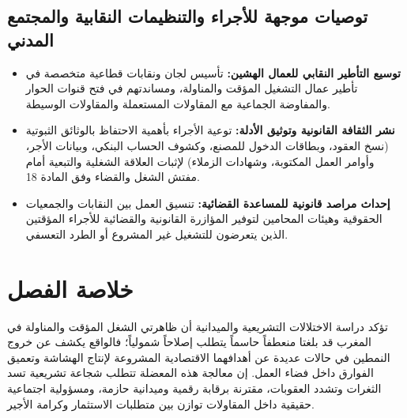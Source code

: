 \subsection{توصيات موجهة للأجراء والتنظيمات النقابية والمجتمع المدني}
\begin{itemize}[leftmargin=*, itemsep=6pt]
    \item \textbf{توسيع التأطير النقابي للعمال الهشين:} تأسيس لجان ونقابات قطاعية متخصصة في تأطير عمال التشغيل المؤقت والمناولة، ومساندتهم في فتح قنوات الحوار والمفاوضة الجماعية مع المقاولات المستعملة والمقاولات الوسيطة.
    \item \textbf{نشر الثقافة القانونية وتوثيق الأدلة:} توعية الأجراء بأهمية الاحتفاظ بالوثائق الثبوتية (نسخ العقود، وبطاقات الدخول للمصنع، وكشوف الحساب البنكي، وبيانات الأجر، وأوامر العمل المكتوبة، وشهادات الزملاء) لإثبات العلاقة الشغلية والتبعية أمام مفتش الشغل والقضاء وفق المادة \textenglish{18}.
    \item \textbf{إحداث مراصد قانونية للمساعدة القضائية:} تنسيق العمل بين النقابات والجمعيات الحقوقية وهيئات المحامين لتوفير المؤازرة القانونية والقضائية للأجراء المؤقتين الذين يتعرضون للتشغيل غير المشروع أو الطرد التعسفي.
\end{itemize}

\section*{خلاصة الفصل}

تؤكد دراسة الاختلالات التشريعية والميدانية أن ظاهرتي الشغل المؤقت والمناولة في المغرب قد بلغتا منعطفاً حاسماً يتطلب إصلاحاً شمولياً؛ فالواقع يكشف عن خروج النمطين في حالات عديدة عن أهدافهما الاقتصادية المشروعة لإنتاج الهشاشة وتعميق الفوارق داخل فضاء العمل. إن معالجة هذه المعضلة تتطلب شجاعة تشريعية تسد الثغرات وتشدد العقوبات، مقترنة برقابة رقمية وميدانية حازمة، ومسؤولية اجتماعية حقيقية داخل المقاولات توازن بين متطلبات الاستثمار وكرامة الأجير.

